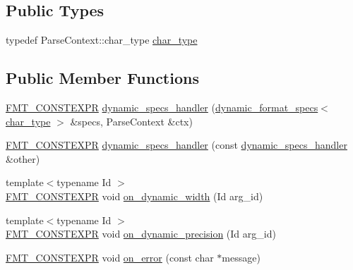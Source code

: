 \subsection*{Public Types}
\begin{DoxyCompactItemize}
\item 
typedef Parse\+Context\+::char\+\_\+type \hyperlink{classinternal_1_1dynamic__specs__handler_a718fa7f12b9f1a5c59fa747214d18f13}{char\+\_\+type}
\end{DoxyCompactItemize}
\subsection*{Public Member Functions}
\begin{DoxyCompactItemize}
\item 
\hyperlink{core_8h_a69201cb276383873487bf68b4ef8b4cd}{F\+M\+T\+\_\+\+C\+O\+N\+S\+T\+E\+X\+PR} \hyperlink{classinternal_1_1dynamic__specs__handler_af06235807a4b30fb270a920422863768}{dynamic\+\_\+specs\+\_\+handler} (\hyperlink{structinternal_1_1dynamic__format__specs}{dynamic\+\_\+format\+\_\+specs}$<$ \hyperlink{classinternal_1_1dynamic__specs__handler_a718fa7f12b9f1a5c59fa747214d18f13}{char\+\_\+type} $>$ \&specs, Parse\+Context \&ctx)
\item 
\hyperlink{core_8h_a69201cb276383873487bf68b4ef8b4cd}{F\+M\+T\+\_\+\+C\+O\+N\+S\+T\+E\+X\+PR} \hyperlink{classinternal_1_1dynamic__specs__handler_a658c0d84c7d999b88ed378016d40f7bf}{dynamic\+\_\+specs\+\_\+handler} (const \hyperlink{classinternal_1_1dynamic__specs__handler}{dynamic\+\_\+specs\+\_\+handler} \&other)
\item 
{\footnotesize template$<$typename Id $>$ }\\\hyperlink{core_8h_a69201cb276383873487bf68b4ef8b4cd}{F\+M\+T\+\_\+\+C\+O\+N\+S\+T\+E\+X\+PR} void \hyperlink{classinternal_1_1dynamic__specs__handler_a72580d0421bb41d217e49d62953bc799}{on\+\_\+dynamic\+\_\+width} (Id arg\+\_\+id)
\item 
{\footnotesize template$<$typename Id $>$ }\\\hyperlink{core_8h_a69201cb276383873487bf68b4ef8b4cd}{F\+M\+T\+\_\+\+C\+O\+N\+S\+T\+E\+X\+PR} void \hyperlink{classinternal_1_1dynamic__specs__handler_acebee4d5ec383da161be7cd33befbb47}{on\+\_\+dynamic\+\_\+precision} (Id arg\+\_\+id)
\item 
\hyperlink{core_8h_a69201cb276383873487bf68b4ef8b4cd}{F\+M\+T\+\_\+\+C\+O\+N\+S\+T\+E\+X\+PR} void \hyperlink{classinternal_1_1dynamic__specs__handler_a2da8a7d9ab4c256d6d3dd03eb93a8362}{on\+\_\+error} (const char $\ast$message)
\end{DoxyCompactItemize}
